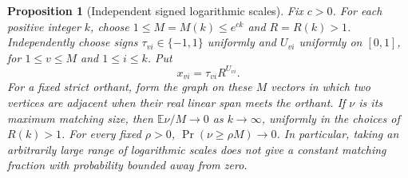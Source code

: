 \documentclass[11pt]{article}
\newtheorem{proposition}{Proposition}
\begin{document}
\begin{proposition}[Independent signed logarithmic scales]
Fix $c>0$. For each positive integer $k$, choose
$1\leq M=M(k)\leq e^{ck}$ and $R=R(k)>1$.
Independently choose signs $\tau_{vi}\in\{-1,1\}$ uniformly and
$U_{vi}$ uniformly on $[0,1]$, for $1\leq v\leq M$ and
$1\leq i\leq k$. Put
\[
 x_{vi}=\tau_{vi}R^{U_{vi}}.
\]
For a fixed strict orthant, form the graph on these $M$ vectors in
which two vertices are adjacent when their real linear span meets
the orthant. If $\nu$ is its maximum matching size, then
$\mathbb E\nu/M\longrightarrow0$ as $k\longrightarrow\infty$,
uniformly in the choices of $R(k)>1$. For every fixed $\rho>0$,
$\Pr(\nu\geq\rho M)\longrightarrow0$. In particular, taking an
arbitrarily large range of logarithmic scales does not give a
constant matching fraction with probability bounded away from zero.
\end{proposition}
\end{document}
